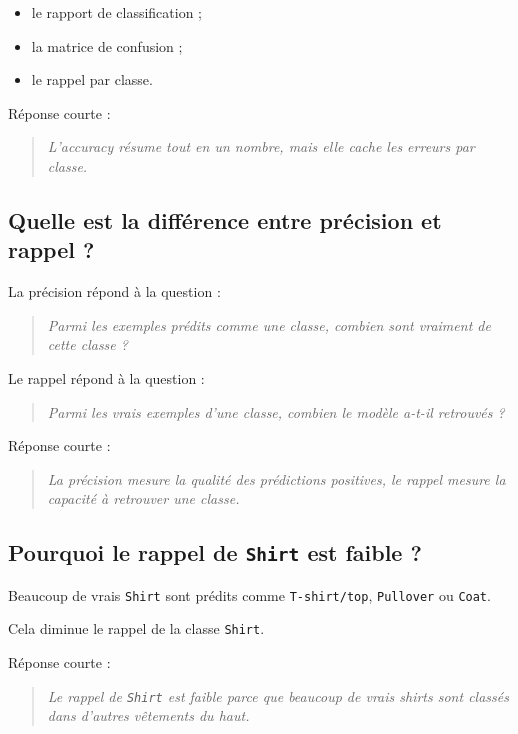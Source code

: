 \documentclass[11pt,a4paper]{article}
\begin{document}
\begin{itemize}
\item le rapport de classification ;
\item la matrice de confusion ;
\item le rappel par classe.
\end{itemize}

Réponse courte :

\begin{quote}
\itshape L'accuracy résume tout en un nombre, mais elle cache les erreurs par classe.
\end{quote}

\subsection{Quelle est la différence entre précision et rappel ?}

La précision répond à la question :

\begin{quote}
\itshape Parmi les exemples prédits comme une classe, combien sont vraiment de cette classe ?
\end{quote}

Le rappel répond à la question :

\begin{quote}
\itshape Parmi les vrais exemples d'une classe, combien le modèle a-t-il retrouvés ?
\end{quote}

Réponse courte :

\begin{quote}
\itshape La précision mesure la qualité des prédictions positives, le rappel mesure la capacité à retrouver une classe.
\end{quote}

\subsection{Pourquoi le rappel de \texttt{Shirt} est faible ?}

Beaucoup de vrais \texttt{Shirt} sont prédits comme \texttt{T-shirt/top}, \texttt{Pullover} ou \texttt{Coat}.

Cela diminue le rappel de la classe \texttt{Shirt}.

Réponse courte :

\begin{quote}
\itshape Le rappel de \texttt{Shirt} est faible parce que beaucoup de vrais shirts sont classés dans d'autres vêtements du haut.
\end{quote}
\end{document}
